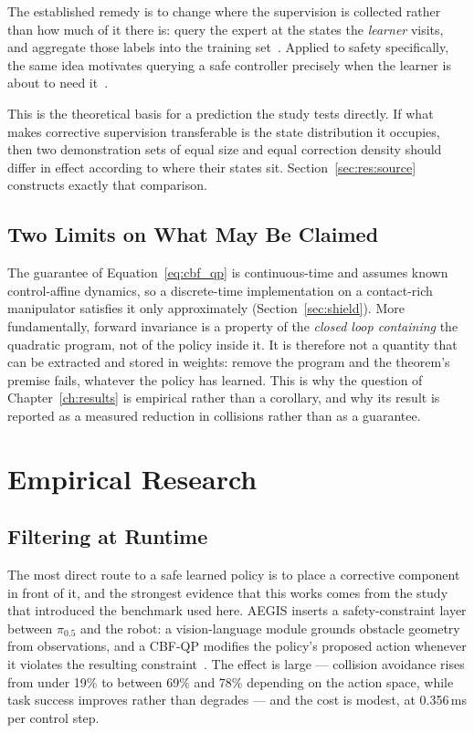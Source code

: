 \documentclass[a4paper,11pt]{report}
\begin{document}
The established remedy is to change where the supervision is collected rather than how much of it
there is: query the expert at the states the \emph{learner} visits, and aggregate those labels into
the training set~\cite{ross2011dagger}. Applied to safety specifically, the same idea motivates
querying a safe controller precisely when the learner is about to need it~\cite{zhang2017safedagger}.

This is the theoretical basis for a prediction the study tests directly. If what makes corrective
supervision transferable is the state distribution it occupies, then two demonstration sets of
equal size and equal correction density should differ in effect according to where their states
sit. Section~\ref{sec:res:source} constructs exactly that comparison.

\subsection{Two Limits on What May Be Claimed}

The guarantee of Equation~\ref{eq:cbf_qp} is continuous-time and assumes known control-affine
dynamics, so a discrete-time implementation on a contact-rich manipulator satisfies it only
approximately (Section~\ref{sec:shield}). More fundamentally, forward invariance is a property of
the \emph{closed loop containing} the quadratic program, not of the policy inside it. It is
therefore not a quantity that can be extracted and stored in weights: remove the program and the
theorem's premise fails, whatever the policy has learned. This is why the question of
Chapter~\ref{ch:results} is empirical rather than a corollary, and why its result is reported as a
measured reduction in collisions rather than as a guarantee.

\section{Empirical Research}\label{sec:bg:empirical}

\subsection{Filtering at Runtime}\label{sec:bg:shielding}

The most direct route to a safe learned policy is to place a corrective component in front of it,
and the strongest evidence that this works comes from the study that introduced the benchmark used
here. AEGIS inserts a safety-constraint layer between $\pi_{0.5}$ and the robot: a vision-language
module grounds obstacle geometry from observations, and a CBF-QP modifies the policy's proposed
action whenever it violates the resulting constraint~\cite{vlsa2026}. The effect is large ---
collision avoidance rises from under 19\% to between 69\% and 78\% depending on the action space,
while task success improves rather than degrades --- and the cost is modest, at 0.356\,ms per
control step.
\end{document}
